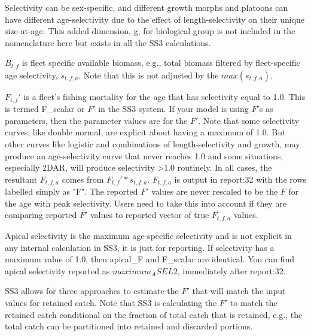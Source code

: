 Selectivity can be sex-specific, and different growth morphs and platoons can have different age-selectivity due to the effect of length-selectivity on their unique size-at-age. This added dimension, g, for biological group is not included in the nomenclature here but exists in all the SS3 calculations.

$B_{t,f}$ is fleet specific available biomass, e.g., total biomass filtered by fleet-specific age selectivity, $s_{t,f,a}$.  Note that this is not adjusted by the $max(s_{t,f,a})$.

$F_{t,f}'$ is a fleet's fishing mortality for the age that has selectivity equal to 1.0.  This is termed F_scalar or  $F'$ in the SS3 system. If your model is using $F'$s as parameters, then the parameter values are for the $F'$. Note that some selectivity curves, like double normal, are explicit about having a maximum of 1.0.  But other curves like logistic and combinations of length-selectivity and growth, may produce an age-selectivity curve that never reaches 1.0 and some situations, especially 2DAR, will produce selectivity >1.0 routinely.  In all cases, the resultant $F_{t,f,a}$ comes from $F_{t,f}' * s_{t,f,a}$. $F_{t,f,a}$ is output in report:32 with the rows labelled simply as "F". The reported $F'$ values are never rescaled to be the $F$ for the age with peak selectivity. Users need to take this into account if they are comparing reported $F'$ values to reported vector of true $F_{t,f,a}$ values.

Apical selectivity is the maximum age-specific selectivity and is not explicit in any internal calculation in SS3, it is just for reporting. If selectivity has a maximum value of 1.0, then apical_F and F_scalar are identical. You can find apical selectivity reported as $maximum_ASEL2$, immediately after report:32.

SS3 allows for three approaches to estimate the $F'$ that will match the input values for retained catch. Note that SS3 is calculating the $F'$ to match the retained catch conditional on the fraction of total catch that is retained, e.g., the total catch can be partitioned into retained and discarded portions.

